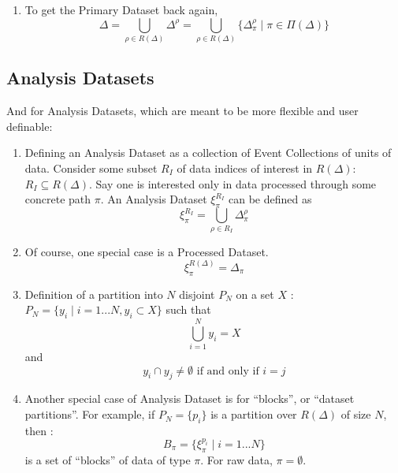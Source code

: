 \documentclass[pdftex]{cmspaper}
\begin{document}
{\begin{enumerate}
\item To get the Primary Dataset back again, 
\begin{equation}
\Delta = \bigcup_{\rho \in R(\Delta)} \Delta^{\rho} = \bigcup_{\rho \in R(\Delta)} \{ \Delta_{\pi}^{\rho} \mid \pi \in \Pi(\Delta) \} 
\end{equation}

\end{enumerate}


\subsection{Analysis Datasets}

And for Analysis Datasets, which are meant to be more flexible and user definable: 

\begin{enumerate}

\item Defining an Analysis Dataset as a collection of Event Collections of 
      units of data. Consider some subset $R_I$ of data indices of interest 
      in $R(\Delta)$:  $R_I \subseteq R(\Delta)$. Say one is interested only 
      in data processed through some concrete path $\pi$.  An Analysis 
      Dataset $\xi_{\pi}^{R_I}$ can be defined as 
\begin{equation}
\xi_{\pi}^{R_I} = \bigcup_{\rho \in R_I} \Delta_{\pi}^{\rho}
\end{equation}

\item Of course, one special case is a Processed Dataset. 
\begin{equation} 
\xi_{\pi}^{R(\Delta)} = \Delta_{\pi}
\end{equation}


\item Definition of a partition into $N$ disjoint $P_N$ on a set $X$ : 
$ P_N = \{ y_i \mid i = 1...N, y_i \subset X \} $ such that 
\begin{equation}
\bigcup_{i=1}^N y_i = X
\end{equation} 
and 
\begin{equation} 
y_i \cap y_j \neq \emptyset \mbox{ if and only if } i = j
\end{equation}
 
\item  Another special case of Analysis Dataset is for ``blocks'', or 
       ``dataset partitions''.  For example, if
$P_N = \{ p_i \}$ is a partition over $R(\Delta)$ of size $N$, then : 
\begin{equation}
B_{\pi} = \{ \xi_{\pi}^{p_i} \mid i = 1...N\}
\end{equation}
is a set of ``blocks'' of data of type $\pi$.  For raw data, $\pi = \emptyset$.



\end{enumerate}}
\end{document}
